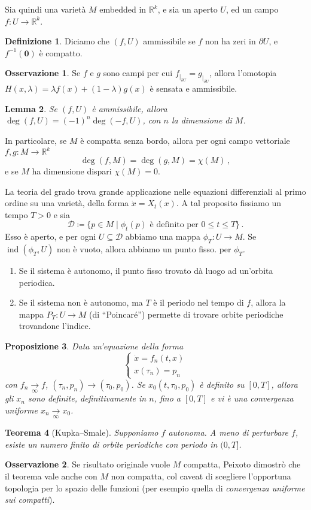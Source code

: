 \documentclass[a4paper, 11pt]{article}
\theoremstyle{definition}
\newtheorem{Def}{Definizione}
\newtheorem*{Oss}{Osservazione}
\theoremstyle{plain}
\newtheorem{Lemma}[Def]{Lemma}
\newtheorem{Prop}[Def]{Proposizione}
\newtheorem{Teo}[Def]{Teorema}
\newcommand{\zero}{\mathbf{0}}
\newcommand{\restr}[2]{{#1}_{|_{#2}}}
\newcommand{\R}{\mathbb{R}}
\newcommand{\DD}{\mathcal{D}}
\DeclareMathOperator{\ind}{ind}
\begin{document}
Sia quindi una varietà $M$ embedded in $\R^k$, e sia un aperto $U$, ed un campo $f \colon U \to \R^k$. 
\begin{Def}
	Diciamo che $(f,U)$ ammissibile se $f$ non ha zeri in $\partial U$, e $f^{-1}(\zero)$ è compatto.
\end{Def}
\begin{Oss}
	Se $f$ e $g$ sono campi per cui $\restr{f}{\partial U} = \restr{g}{\partial U}$, allora l'omotopia $H(x,\lambda) = \lambda f(x) + (1-\lambda)g(x)$ è sensata e ammissibile.
\end{Oss}


\begin{Lemma}
	Se $(f,U)$ è ammissibile, allora $\deg(f,U) = (-1)^n\deg(-f,U)$, con $n$ la dimensione di $M$.
\end{Lemma}

In particolare, se $M$ è compatta senza bordo, allora per ogni campo vettoriale $f,g \colon M \to \R^k$
\[
	\deg(f,M) = \deg(g,M) = \chi(M)\,,
\]
e se $M$ ha dimensione dispari $\chi(M) = 0$.

La teoria del grado trova grande applicazione nelle equazioni differenziali al primo ordine su una varietà, della forma $\dot{x} = X_t(x)$. A tal proposito fissiamo un tempo $T > 0$ e sia
\[
	\DD \coloneqq \{p \in M \mid \phi_t(p) \text{ è definito per } 0 \le t \le T\}\,.
\]
Esso è aperto, e per ogni $U \subseteq \DD$ abbiamo una mappa $\phi_T \colon U \to M$. Se $\ind(\phi_T, U)$ non è vuoto, allora abbiamo un punto fisso. per $\phi_T$.

\begin{enumerate}
	\item Se il sistema è autonomo, il punto fisso trovato dà luogo ad un'orbita periodica.
	\item Se il sistema non è autonomo, ma $T$ è il periodo nel tempo di $f$, allora la mappa $P_T \colon U \to M$ (di ``Poincaré'') permette di trovare orbite periodiche trovandone l'indice. 
\end{enumerate}

\begin{Prop}
	Data un'equazione della forma
	\[
		\begin{cases}
			\dot{x} = f_n(t,x) \\
			x(\tau_n) = p_n
		\end{cases}
	\]
	con $f_n \underset{\infty}{\to} f$, $(\tau_n ,p_n) \to (\tau_0, p_0)$. Se $x_0(t, \tau_0, p_0)$ è definito su $[0,T]$, allora gli $x_n$ sono definite, definitivamente in $n$, fino a $[0,T]$ e vi è una convergenza uniforme $x_n \underset{\infty}{\to} x_0$.
\end{Prop}
\begin{Teo}[Kupka--Smale]
	Supponiamo $f$ autonoma. A meno di perturbare $f$, esiste un numero finito di orbite periodiche con periodo in $(0,T]$. 
\end{Teo}
\begin{Oss}
	Se risultato originale vuole $M$ compatta, Peixoto \cite{Peixoto1966} dimostrò che il teorema vale anche con $M$ non compatta, col caveat di scegliere l'opportuna topologia per lo spazio delle funzioni (per esempio quella di \emph{convergenza uniforme sui compatti}).
\end{Oss}
\end{document}
